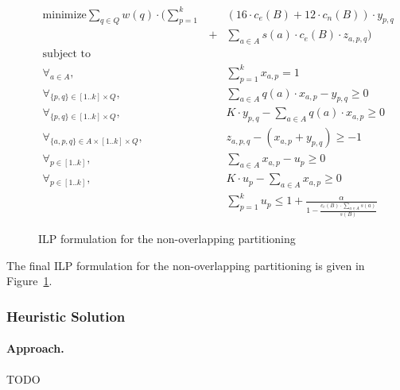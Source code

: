 \begin{figure}[!t]
\begin{mdframed}
\begin{eqnarray}
\text{minimize}  
    \sum_{q\in Q} w(q)\cdot \Big(\sum_{p=1}^{k} \!\!&&\!\! (16\cdot c_e(B) + 12\cdot c_n(B))\cdot y_{p,q}\nonumber\\
    &+& \sum_{a\in A} s(a)\cdot c_e(B)\cdot z_{a,p,q} \Big) \nonumber\\
\text{subject to}&&\nonumber\\
\forall_{a\in A}, 
    && \sum_{p=1}^{k} x_{a,p} = 1\nonumber\\
\forall_{\{p,q\}\in [1..k]\times Q}, 
    &&  \sum_{a\in A} q(a)\cdot x_{a,p} - y_{p,q} \geq 0 \nonumber\\
\forall_{\{p,q\}\in [1..k]\times Q}, 
    &&  K\cdot y_{p,q} - \sum_{a\in A} q(a)\cdot x_{a,p}  \geq 0 \nonumber\\
\forall_{\{a,p,q\}\in A\times [1..k]\times Q},
    && z_{a,p,q} - (x_{a,p} + y_{p,q}) \geq -1\nonumber\\
\forall_{p\in[1..k]},
    && \sum_{a\in A} x_{a,p} - u_p \geq 0 \nonumber\\
\forall_{p\in[1..k]},
    && K\cdot u_p - \sum_{a\in A} x_{a,p} \geq 0 \nonumber\\    
&& \sum_{p=1}^{k} u_p \leq 1 + \frac{\alpha}
  {1-\frac{c_e(B)\cdot \sum_{a\in A} s(a)}{s(B)}} \nonumber
\end{eqnarray}
\end{mdframed}
\caption{ILP formulation for the non-overlapping partitioning}
\label{fig:nov-ilp}
\end{figure}

The final ILP formulation for the non-overlapping partitioning is given in
Figure~\ref{fig:nov-ilp}.

\subsubsection{Heuristic Solution}

\paragraph*{Approach.$\,$}
TODO

